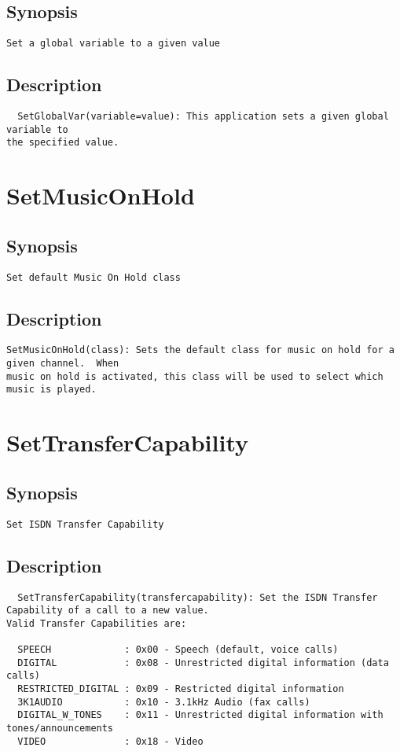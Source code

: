 \subsection{Synopsis}
\begin{verbatim}
Set a global variable to a given value
\end{verbatim}
\subsection{Description}
\begin{verbatim}
  SetGlobalVar(variable=value): This application sets a given global variable to
the specified value.

\end{verbatim}


\section{SetMusicOnHold}
\subsection{Synopsis}
\begin{verbatim}
Set default Music On Hold class
\end{verbatim}
\subsection{Description}
\begin{verbatim}
SetMusicOnHold(class): Sets the default class for music on hold for a given channel.  When
music on hold is activated, this class will be used to select which
music is played.

\end{verbatim}


\section{SetTransferCapability}
\subsection{Synopsis}
\begin{verbatim}
Set ISDN Transfer Capability
\end{verbatim}
\subsection{Description}
\begin{verbatim}
  SetTransferCapability(transfercapability): Set the ISDN Transfer 
Capability of a call to a new value.
Valid Transfer Capabilities are:

  SPEECH             : 0x00 - Speech (default, voice calls)
  DIGITAL            : 0x08 - Unrestricted digital information (data calls)
  RESTRICTED_DIGITAL : 0x09 - Restricted digital information
  3K1AUDIO           : 0x10 - 3.1kHz Audio (fax calls)
  DIGITAL_W_TONES    : 0x11 - Unrestricted digital information with tones/announcements
  VIDEO              : 0x18 - Video


\end{verbatim}


